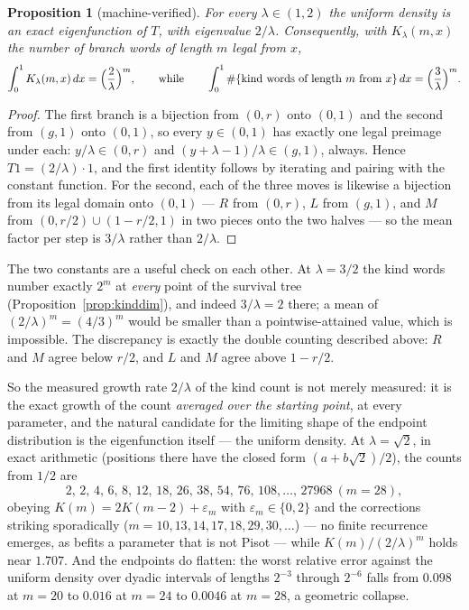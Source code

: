 \documentclass[11pt,reqno]{amsart}
\theoremstyle{plain}
\newtheorem{proposition}[theorem]{Proposition}
\theoremstyle{definition}
\theoremstyle{remark}
\begin{document}
\begin{proposition}[machine-verified]\label{prop:lebeigen}
For every $\lambda\in(1,2)$ the uniform density is an exact eigenfunction of
$T$, with eigenvalue $2/\lambda$. Consequently, with $K_\lambda(m,x)$ the
number of branch words of length $m$ legal from $x$,
\[
  \int_0^1K_\lambda(m,x)\,dx=\Bigl(\frac2\lambda\Bigr)^{m},
  \qquad\text{while}\qquad
  \int_0^1\#\{\text{kind words of length }m\text{ from }x\}\,dx
  =\Bigl(\frac3\lambda\Bigr)^{m}.
\]
\end{proposition}

\begin{proof}
The first branch is a bijection from $(0,r)$ onto $(0,1)$ and the second from
$(g,1)$ onto $(0,1)$, so every $y\in(0,1)$ has exactly one legal preimage
under each: $y/\lambda\in(0,r)$ and $(y+\lambda-1)/\lambda\in(g,1)$, always.
Hence $T1=(2/\lambda)\cdot1$, and the first identity follows by iterating and
pairing with the constant function. For the second, each of the three moves is
likewise a bijection from its legal domain onto $(0,1)$ --- $R$ from $(0,r)$,
$L$ from $(g,1)$, and $M$ from $(0,r/2)\cup(1-r/2,1)$ in two pieces onto the
two halves --- so the mean factor per step is $3/\lambda$ rather than
$2/\lambda$.
\end{proof}

The two constants are a useful check on each other. At $\lambda=3/2$ the kind
words number exactly $2^m$ at \emph{every} point of the survival tree
(Proposition~\ref{prop:kinddim}), and indeed $3/\lambda=2$ there; a mean of
$(2/\lambda)^m=(4/3)^m$ would be smaller than a pointwise-attained value,
which is impossible. The discrepancy is exactly the double counting described
above: $R$ and $M$ agree below $r/2$, and $L$ and $M$ agree above $1-r/2$.

So the measured growth rate $2/\lambda$ of the kind count is not merely
measured: it is the exact growth of the count \emph{averaged over the starting
point}, at every parameter, and the natural candidate for the limiting shape
of the endpoint distribution is the eigenfunction itself --- the uniform
density. At $\lambda=\sqrt2$, in exact arithmetic (positions there have the
closed form $(a+b\sqrt2)/2$), the counts from $1/2$ are
\[
2,\,2,\,4,\,6,\,8,\,12,\,18,\,26,\,38,\,54,\,76,\,108,\dots,\,27968\ (m=28),
\]
obeying $K(m)=2K(m-2)+\varepsilon_m$ with $\varepsilon_m\in\{0,2\}$ and the
corrections striking sporadically ($m=10,13,14,17,18,29,30,\dots$) --- no
finite recurrence emerges, as befits a parameter that is not Pisot --- while
$K(m)/(2/\lambda)^m$ holds near $1.707$. And the endpoints do flatten: the
worst relative error against the uniform density over dyadic intervals of
lengths $2^{-3}$ through $2^{-6}$ falls from $0.098$ at $m=20$ to $0.016$ at
$m=24$ to $0.0046$ at $m=28$, a geometric collapse.
\end{document}
